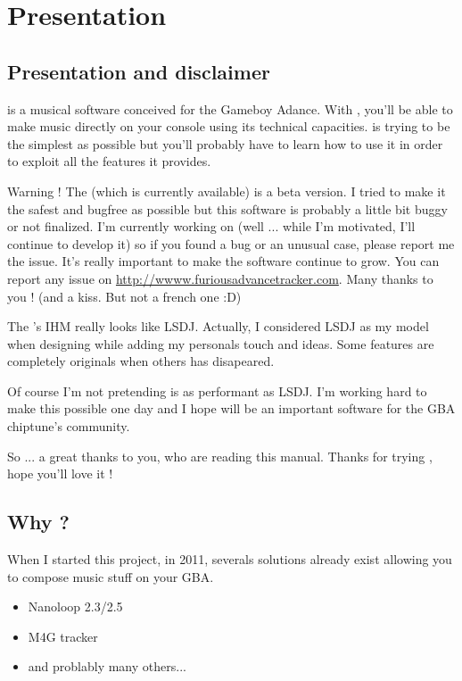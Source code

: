 \documentclass[12pt,a4paper]{article}
\begin{document}
  \section{Presentation}
    \subsection{Presentation and disclaimer}
    \FAT is a musical software conceived for the Gameboy Adance.
    With \FAT, you'll be able to make music directly on your console using its technical capacities.
    \FAT is trying to be the simplest as possible but you'll probably have to learn how to use it in order to exploit all the features it provides.
    \medskip

    Warning ! The \fatversion (which is currently available) is a beta version.
    I tried to make it the safest and bugfree as possible but this software is probably a little bit buggy or not finalized.
    I'm currently working on \FAT (well ... while I'm motivated, I'll continue to develop it) so if you found a bug or an unusual case, please report me the issue.
    It's really important to make the software continue to grow. You can report any issue on \url{http://wwww.furiousadvancetracker.com}.
    Many thanks to you ! (and a kiss. But not a french one :D)
    \medskip

    The \FAT's IHM really looks like LSDJ. Actually, I considered LSDJ as my model when designing \FAT while adding my personals touch and ideas.
    Some features are completely originals when others has disapeared.
    \medskip
    
    Of course I'm not pretending \FAT is as performant as LSDJ. I'm working hard to make this possible one day and I hope \FAT will be an important software for the GBA chiptune's community.
    \medskip

    So ... a great thanks to you, who are reading this manual. Thanks for trying \FAT, hope you'll love it !

    \subsection{Why \FAT ?}
    When I started this project, in 2011, severals solutions already exist allowing you to compose music stuff on your GBA.
    \medskip

    \begin{itemize}
        \item{Nanoloop 2.3/2.5}
        \item{M4G tracker}
        \item{and problably many others...}
    \end{itemize}\medskip
\end{document}
